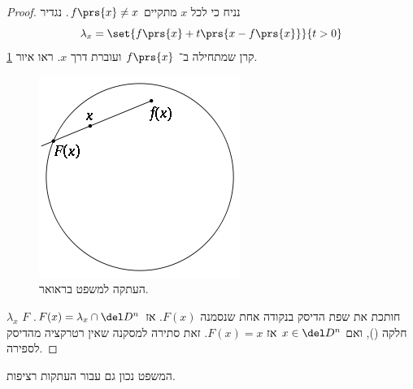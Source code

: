 \documentclass[a4paper,10pt,twoside,openany]{book}
\begin{document}
\begin{proof}
נניח כי לכל
$x$
מתקיים
$f\prs{x} \neq x$.
נגדיר
\[\lambda_x = \set{f\prs{x} + t\prs{x - f\prs{x}}}{t > 0}\]
קרן שמתחילה ב־%
$f\prs{x}$
ועוברת דרך
$x$.
ראו איור
\ref{brouwer:map}.
\begin{figure}
\includegraphics[scale=0.8]{sources/retraction_lemma}
\caption{העתקה למשפט בראואר.}
\label{brouwer:map}
\end{figure}
$\lambda_x$
חותכת את שפת הדיסק בנקודה אחת שנסמנה
$F(x)$.
אז
$F(x) = \lambda_x \cap \del D^n$.
$F$
חלקה (), ואם
$x \in \del D^n$
אז
$F(x) = x$.
זאת סתירה למסקנה שאין רטרקציה מהדיסק לספירה.
\end{proof}
\begin{remark}
המשפט נכון גם עבור העתקות רציפות.
\end{remark}
\end{document}
